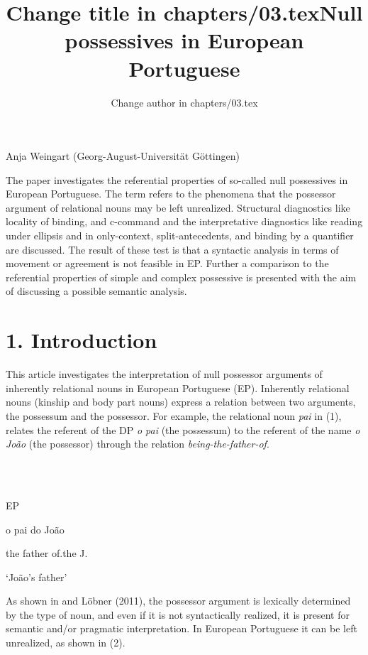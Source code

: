 \documentclass[output=paper]{langsci/langscibook}
\author{Change author in chapters/03.tex}
\title{Change title in chapters/03.tex}
\begin{document}
\title{Null possessives in European Portuguese}

Anja Weingart (Georg-August-Universität Göttingen)

\begin{stylelsAbstract}
The paper investigates the referential properties of so-called null possessives in European Portuguese. The term refers to the phenomena that the possessor argument of relational nouns may be left unrealized. Structural diagnostics like locality of binding, and c-command and the interpretative diagnostics like reading under ellipsis and in only-context, split-antecedents, and binding by a quantifier are discussed. The result of these test is that a syntactic analysis in terms of movement or agreement is not feasible in EP. Further a comparison to the referential properties of simple and complex possessive is presented with the aim of discussing a possible semantic analysis.
\end{stylelsAbstract}

\section{ 1. Introduction}

This article investigates the interpretation of null possessor arguments of inherently relational nouns in European Portuguese (EP). Inherently relational nouns (kinship and body part nouns) express a relation between two arguments, the possessum and the possessor. For example, the relational noun \textit{pai} in (1), relates the referent of the DP \textit{o pai} (the possessum) to the referent of the name \textit{o João} (the possessor) through the relation \textit{being-the-father-of}.

\ea%
    \label{ex:key:1}
    \gll\\
        \\
    \glt
    \z

          EP

o   pai   do   João

the   father of.the   J.

‘João’s father’

As shown in \citet{Barker2011} and Löbner (2011), the possessor argument is lexically determined by the type of noun, and even if it is not syntactically realized, it is present for semantic and/or pragmatic interpretation. In European Portuguese it can be left unrealized, as shown in (2).

\ea%
    \label{ex:key:2}
    \gll\\
        \\
    \glt
    \z
\end{document}
